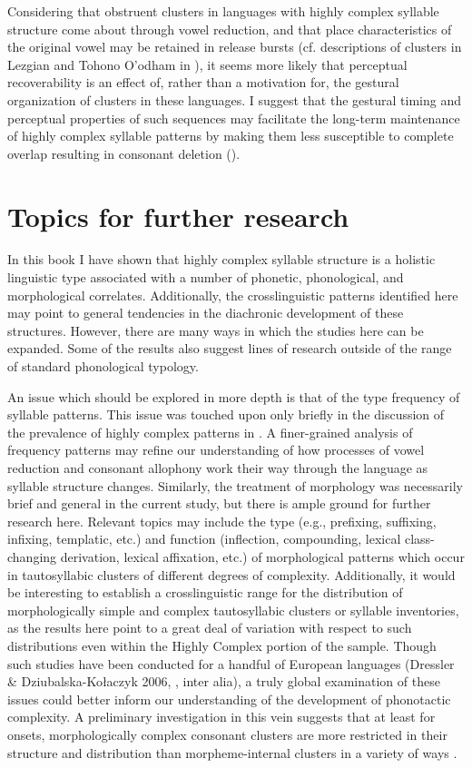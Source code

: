   Considering that obstruent clusters in languages with highly complex syllable structure come about through vowel reduction, and that place characteristics of the original vowel may be retained in release bursts (cf. descriptions of clusters in Lezgian and Tohono O’odham in ), it seems more likely that perceptual recoverability is an effect of, rather than a motivation for, the gestural organization of clusters in these languages. I suggest that the gestural timing and perceptual properties of such sequences may facilitate the long-term maintenance of highly complex syllable patterns by making them less susceptible to complete overlap resulting in consonant deletion (\citealt{BrowmanGoldstein1990}).

\section{Topics for further research}\label{sec:8.6}

  In this book I have shown that highly complex syllable structure is a holistic linguistic type associated with a number of phonetic, phonological, and morphological correlates. Additionally, the crosslinguistic patterns identified here may point to general tendencies in the diachronic development of these structures. However, there are many ways in which the studies here can be expanded. Some of the results also suggest lines of research outside of the range of standard phonological typology.

  An issue which should be explored in more depth is that of the type frequency of syllable patterns. This issue was touched upon only briefly in the discussion of the prevalence of highly complex patterns in . A finer-grained analysis of frequency patterns may refine our understanding of how processes of vowel reduction and consonant allophony work their way through the language as syllable structure changes. Similarly, the treatment of morphology was necessarily brief and general in the current study, but there is ample ground for further research here. Relevant topics may include the type (e.g., prefixing, suffixing, infixing, templatic, etc.) and function (inflection, compounding, lexical class-changing derivation, lexical affixation, etc.) of morphological patterns which occur in tautosyllabic clusters of different degrees of complexity. Additionally, it would be interesting to establish a crosslinguistic range for the distribution of morphologically simple and complex tautosyllabic clusters or syllable inventories, as the results here point to a great deal of variation with respect to such distributions even within the Highly Complex portion of the sample. Though such studies have been conducted for a handful of European languages (Dressler \& Dziubalska-Kołaczyk 2006, \citealt{DresslerEtAl2010}, inter alia), a truly global examination of these issues could better inform our understanding of the development of phonotactic complexity. A preliminary investigation in this vein suggests that at least for onsets, morphologically complex consonant clusters are more restricted in their structure and distribution than morpheme-internal clusters in a variety of ways \citep{Easterday2019}.

